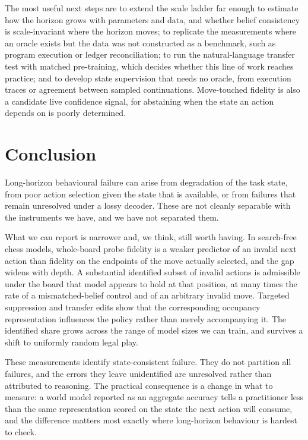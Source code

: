 \documentclass[11pt]{article}
\theoremstyle{remark}
\begin{document}
The most useful next steps are to extend the scale ladder far enough to estimate
how the horizon grows with parameters and data, and whether belief consistency is
scale-invariant where the horizon moves; to replicate the measurements where an
oracle exists but the data was not constructed as a benchmark, such as program
execution or ledger reconciliation; to run the natural-language transfer test
with matched pre-training, which decides whether this line of work reaches
practice; and to develop state supervision that needs no oracle, from execution
traces or agreement between sampled continuations. Move-touched fidelity is also
a candidate live confidence signal, for abstaining when the state an action
depends on is poorly determined.

\section{Conclusion}

Long-horizon behavioural failure can arise from degradation of the task state,
from poor action selection given the state that is available, or from failures
that remain unresolved under a lossy decoder. These are not cleanly separable
with the instruments we have, and we have not separated them.

What we can report is narrower and, we think, still worth having. In search-free
chess models, whole-board probe fidelity is a weaker predictor of an invalid next
action than fidelity on the endpoints of the move actually selected, and the gap
widens with depth. A substantial identified subset of invalid actions is
admissible under the board that model appears to hold at that position, at many
times the rate of a mismatched-belief control and of an arbitrary invalid move.
Targeted suppression and transfer edits show that the corresponding occupancy
representation influences the policy rather than merely accompanying it. The
identified share grows across the range of model sizes we can train, and survives
a shift to uniformly random legal play.

These measurements identify state-consistent failure. They do not partition all
failures, and the errors they leave unidentified are unresolved rather than
attributed to reasoning. The practical consequence is a change in what to
measure: a world model reported as an aggregate accuracy tells a practitioner
less than the same representation scored on the state the next action will
consume, and the difference matters most exactly where long-horizon behaviour is
hardest to check.
\end{document}
